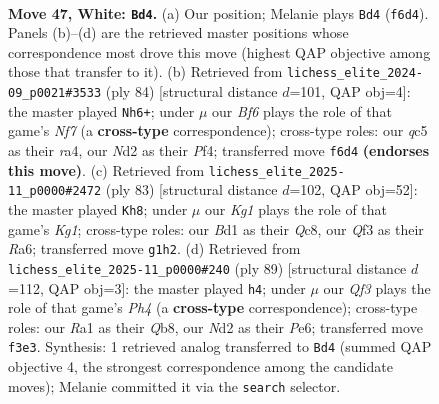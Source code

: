 \documentclass[11pt]{article}
\begin{document}
\clearpage

\begin{figure}[p]\centering
\begin{subfigure}{0.46\textwidth}\centering
\resizebox{\linewidth}{!}{%
\newchessgame
\chessboard[
  setfen={1r2r3/Rb3p1k/1p3Bp1/2q5/7P/1P3Q2/2PN4/R2B2K1 w - - 7 47},
  showmover=false,
  pgfstyle=straightmove, color=movearrow, markmove={f6-d4}
]}
\caption{}
\end{subfigure}\hfill
\begin{subfigure}{0.46\textwidth}\centering
\resizebox{\linewidth}{!}{%
\newchessgame
\chessboard[
  setfen={3b1rk1/3R1Npp/p7/4P3/r4Pq1/4Q3/1P1B3K/5R2 w - - 2 43},
  showmover=false,
  pgfstyle=straightmove, color=movearrow, markmove={f7-h6}
]}
\caption{}
\end{subfigure}
\\[4pt]
\begin{subfigure}{0.46\textwidth}\centering
\resizebox{\linewidth}{!}{%
\newchessgame
\chessboard[
  setfen={2q3k1/7p/r3b3/1p1p2Q1/2n2PP1/p6P/P5B1/4R1K1 b - - 6 42},
  showmover=false,
  pgfstyle=straightmove, color=movearrow, markmove={g8-h8}
]}
\caption{}
\end{subfigure}\hfill
\begin{subfigure}{0.46\textwidth}\centering
\resizebox{\linewidth}{!}{%
\newchessgame
\chessboard[
  setfen={1q6/5pk1/4pnp1/4b2p/2Q5/5PP1/1rB2B1P/5R1K b - - 3 45},
  showmover=false,
  pgfstyle=straightmove, color=movearrow, markmove={h5-h4}
]}
\caption{}
\end{subfigure}
\caption{\textbf{Move 47, White: \texttt{Bd4}.} (a) Our position; Melanie plays \texttt{Bd4} (\texttt{f6d4}). Panels (b)--(d) are the retrieved master positions whose correspondence most drove this move (highest QAP objective among those that transfer to it). (b) Retrieved from \texttt{lichess\_elite\_2024-09\_p0021\#3533} (ply 84) [structural distance $d$=101, QAP obj=4]: the master played \texttt{Nh6+}; under $\mu$ our \emph{Bf6} plays the role of that game's \emph{Nf7} (a \textbf{cross-type} correspondence); cross-type roles: our \emph{q}c5 as their \emph{r}a4, our \emph{N}d2 as their \emph{P}f4; transferred move \texttt{f6d4} \textbf{(endorses this move)}. (c) Retrieved from \texttt{lichess\_elite\_2025-11\_p0000\#2472} (ply 83) [structural distance $d$=102, QAP obj=52]: the master played \texttt{Kh8}; under $\mu$ our \emph{Kg1} plays the role of that game's \emph{Kg1}; cross-type roles: our \emph{B}d1 as their \emph{Q}c8, our \emph{Q}f3 as their \emph{R}a6; transferred move \texttt{g1h2}. (d) Retrieved from \texttt{lichess\_elite\_2025-11\_p0000\#240} (ply 89) [structural distance $d$=112, QAP obj=3]: the master played \texttt{h4}; under $\mu$ our \emph{Qf3} plays the role of that game's \emph{Ph4} (a \textbf{cross-type} correspondence); cross-type roles: our \emph{R}a1 as their \emph{Q}b8, our \emph{N}d2 as their \emph{P}e6; transferred move \texttt{f3e3}. Synthesis: 1 retrieved analog transferred to \texttt{Bd4} (summed QAP objective 4, the strongest correspondence among the candidate moves); Melanie committed it via the \texttt{search} selector.}
\label{fig:thought-m92}
\end{figure}
\end{document}
